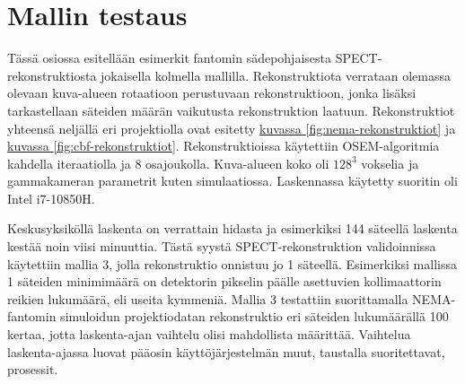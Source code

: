 \section{Mallin testaus}
Tässä osiossa esitellään esimerkit fantomin sädepohjaisesta SPECT-rekonstruktiosta jokaisella kolmella mallilla. Rekonstruktiota verrataan olemassa olevaan kuva-alueen rotaatioon perustuvaan rekonstruktioon, jonka lisäksi tarkastellaan säteiden määrän vaikutusta rekonstruktion laatuun. Rekonstruktiot yhteensä neljällä eri projektiolla ovat esitetty \hyperref[fig:nema-rekonstruktiot]{kuvassa \ref*{fig:nema-rekonstruktiot}} ja \hyperref[fig:cbf-rekonstruktiot]{kuvassa \ref*{fig:cbf-rekonstruktiot}}. Rekonstruktioissa käytettiin OSEM-algoritmia kahdella iteraatiolla ja 8 osajoukolla. Kuva-alueen koko oli $128^3$ vokselia ja gammakameran parametrit kuten simulaatiossa. Laskennassa käytetty suoritin oli Intel i7-10850H.

Keskusyksiköllä laskenta on verrattain hidasta ja esimerkiksi 144 säteellä laskenta kestää noin viisi minuuttia. Tästä syystä SPECT-rekonstruktion validoinnissa käytettiin mallia 3, jolla rekonstruktio onnistuu jo 1 säteellä. Esimerkiksi mallissa 1 säteiden minimimäärä on detektorin pikselin päälle asettuvien kollimaattorin reikien lukumäärä, eli useita kymmeniä. Mallia 3 testattiin suorittamalla NEMA-fantomin simuloidun projektiodatan rekonstruktio eri säteiden lukumäärällä 100 kertaa, jotta laskenta-ajan vaihtelu olisi mahdollista määrittää. Vaihtelua laskenta-ajassa luovat pääosin käyttöjärjestelmän muut, taustalla suoritettavat, prosessit.

